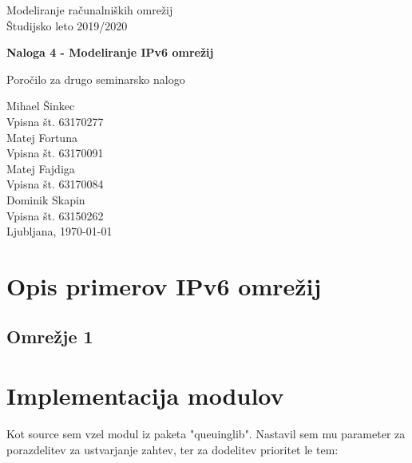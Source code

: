 \documentclass[11pt,a4paper,slovene]{myarticle}
\begin{document}
\label{naslov}
\thispagestyle{empty}

\begin{center}
\begin{Large}
Modeliranje računalniških omrežij\\
Študijsko leto 2019/2020\\
\end{Large}

\vspace*{4cm}
\begin{LARGE}
\textbf{Naloga 4 - Modeliranje IPv6 omrežij\\}
\end{LARGE}
\vspace*{0.5cm}

\begin{Large}
Poročilo za drugo seminarsko nalogo\\

\vspace*{4cm}

Mihael Šinkec\\
Vpisna št. 63170277\\
Matej Fortuna\\
Vpisna št. 63170091\\
Matej Fajdiga\\
Vpisna št. 63170084\\
Dominik Skapin\\
Vpisna št. 63150262\\

\vspace*{5cm}
Ljubljana, \today
\end{Large}
\end{center}

\pagebreak
\setcounter{page}{1}


\label{Kazalo}
\tableofcontents
\thispagestyle{empty}
\pagebreak

\section{Opis primerov IPv6 omrežij}
\subsection{Omrežje 1}


\section{Implementacija modulov}
Kot source sem vzel modul iz paketa "queuinglib". Nastavil sem mu parameter za porazdelitev za ustvarjanje zahtev, ter za dodelitev prioritet le tem:
\end{document}

